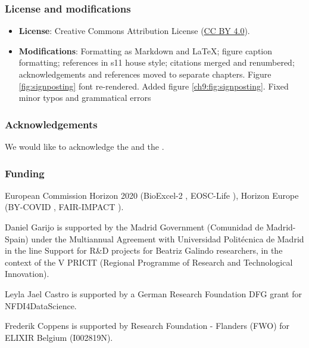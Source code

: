 \subsubsection*{License and modifications}

\begin{itemize}
\tightlist
\item
  \textbf{License}: Creative Commons Attribution License
  (\href{https://spdx.org/licenses/CC-BY-4.0}{CC BY 4.0}).
\item
  \textbf{Modifications}: Formatting as Markdown and LaTeX; figure caption
  formatting; references in s11 house style; citations merged and renumbered; 
  acknowledgements and references moved to separate chapters. 
  Figure \ref{fig:signposting} font re-rendered. Added figure \ref{ch9:fig:signposting}. Fixed minor typos and grammatical errors
\end{itemize}

\subsubsection*{Acknowledgements}

We would like to acknowledge the
 and the
.

\subsubsection*{Funding}

European Commission Horizon 2020 (BioExcel-2
, EOSC-Life
), Horizon
Europe (BY-COVID
,
FAIR-IMPACT
).

Daniel Garijo is supported by the Madrid Government (Comunidad de
Madrid-Spain) under the Multiannual Agreement with Universidad
Politécnica de Madrid in the line Support for R\&D projects for Beatriz
Galindo researchers, in the context of the V PRICIT (Regional Programme
of Research and Technological Innovation).

Leyla Jael Castro is supported by a German Research Foundation DFG grant
for NFDI4DataScience.

Frederik Coppens is supported by Research Foundation - Flanders (FWO)
for ELIXIR Belgium (I002819N).


